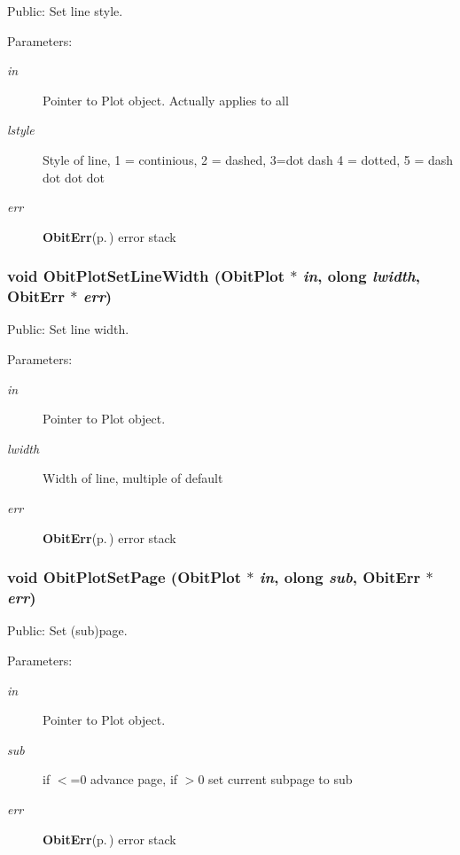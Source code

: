 Public: Set line style. 

\begin{Desc}
\item[Parameters:]
\begin{description}
\item[{\em in}]Pointer to Plot object. Actually applies to all \item[{\em lstyle}]Style of line, 1 = continious, 2 = dashed, 3=dot dash 4 = dotted, 5 = dash dot dot dot \item[{\em err}]{\bf Obit\-Err}{\rm (p.\,\pageref{structObitErr})} error stack \end{description}
\end{Desc}
\subsubsection{\setlength{\rightskip}{0pt plus 5cm}void Obit\-Plot\-Set\-Line\-Width ({\bf Obit\-Plot} $\ast$ {\em in}, {\bf olong} {\em lwidth}, {\bf Obit\-Err} $\ast$ {\em err})}\label{ObitPlot_8h_a19}


Public: Set line width. 

\begin{Desc}
\item[Parameters:]
\begin{description}
\item[{\em in}]Pointer to Plot object. \item[{\em lwidth}]Width of line, multiple of default \item[{\em err}]{\bf Obit\-Err}{\rm (p.\,\pageref{structObitErr})} error stack \end{description}
\end{Desc}
\subsubsection{\setlength{\rightskip}{0pt plus 5cm}void Obit\-Plot\-Set\-Page ({\bf Obit\-Plot} $\ast$ {\em in}, {\bf olong} {\em sub}, {\bf Obit\-Err} $\ast$ {\em err})}\label{ObitPlot_8h_a22}


Public: Set (sub)page. 

\begin{Desc}
\item[Parameters:]
\begin{description}
\item[{\em in}]Pointer to Plot object. \item[{\em sub}]if $<$=0 advance page, if $>$0 set current subpage to sub \item[{\em err}]{\bf Obit\-Err}{\rm (p.\,\pageref{structObitErr})} error stack \end{description}
\end{Desc}
